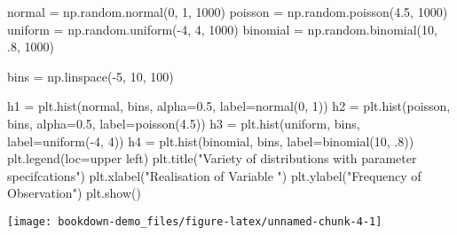 \documentclass[]{tufte-book}
\newenvironment{Shaded}{}{}
\newcommand{\DecValTok}[1]{\textcolor[rgb]{0.25,0.63,0.44}{#1}}
\newcommand{\FloatTok}[1]{\textcolor[rgb]{0.25,0.63,0.44}{#1}}
\newcommand{\NormalTok}[1]{#1}
\newcommand{\OperatorTok}[1]{\textcolor[rgb]{0.40,0.40,0.40}{#1}}
\newcommand{\StringTok}[1]{\textcolor[rgb]{0.25,0.44,0.63}{#1}}
\theoremstyle{definition}
\theoremstyle{definition}
\theoremstyle{definition}
\theoremstyle{remark}
\begin{document}
\begin{Shaded}
\begin{Highlighting}[]
\NormalTok{normal }\OperatorTok{=}\NormalTok{ np.random.normal(}\DecValTok{0}\NormalTok{, }\DecValTok{1}\NormalTok{, }\DecValTok{1000}\NormalTok{)}
\NormalTok{poisson }\OperatorTok{=}\NormalTok{ np.random.poisson(}\FloatTok{4.5}\NormalTok{, }\DecValTok{1000}\NormalTok{)}
\NormalTok{uniform }\OperatorTok{=}\NormalTok{ np.random.uniform(}\OperatorTok{{-}}\DecValTok{4}\NormalTok{, }\DecValTok{4}\NormalTok{, }\DecValTok{1000}\NormalTok{)}
\NormalTok{binomial }\OperatorTok{=}\NormalTok{ np.random.binomial(}\DecValTok{10}\NormalTok{, }\FloatTok{.8}\NormalTok{, }\DecValTok{1000}\NormalTok{)}

\NormalTok{bins }\OperatorTok{=}\NormalTok{ np.linspace(}\OperatorTok{{-}}\DecValTok{5}\NormalTok{, }\DecValTok{10}\NormalTok{, }\DecValTok{100}\NormalTok{)}

\NormalTok{h1 }\OperatorTok{=}\NormalTok{ plt.hist(normal, bins, alpha}\OperatorTok{=}\FloatTok{0.5}\NormalTok{, label}\OperatorTok{=}\StringTok{\textquotesingle{}normal(0, 1)\textquotesingle{}}\NormalTok{)}
\NormalTok{h2 }\OperatorTok{=}\NormalTok{ plt.hist(poisson, bins, alpha}\OperatorTok{=}\FloatTok{0.5}\NormalTok{, label}\OperatorTok{=}\StringTok{\textquotesingle{}poisson(4.5)\textquotesingle{}}\NormalTok{)}
\NormalTok{h3 }\OperatorTok{=}\NormalTok{ plt.hist(uniform, bins, label}\OperatorTok{=}\StringTok{\textquotesingle{}uniform({-}4, 4)\textquotesingle{}}\NormalTok{)}
\NormalTok{h4 }\OperatorTok{=}\NormalTok{ plt.hist(binomial, bins, label}\OperatorTok{=}\StringTok{\textquotesingle{}binomial(10, .8)\textquotesingle{}}\NormalTok{)}
\NormalTok{plt.legend(loc}\OperatorTok{=}\StringTok{\textquotesingle{}upper left\textquotesingle{}}\NormalTok{)}
\NormalTok{plt.title(}\StringTok{"Variety of distributions with parameter specifcations"}\NormalTok{)}
\NormalTok{plt.xlabel(}\StringTok{"Realisation of Variable "}\NormalTok{)}
\NormalTok{plt.ylabel(}\StringTok{"Frequency of Observation"}\NormalTok{)}
\NormalTok{plt.show()}
\end{Highlighting}
\end{Shaded}

\texttt{[image: bookdown-demo\_files/figure-latex/unnamed-chunk-4-1]}
\end{document}
